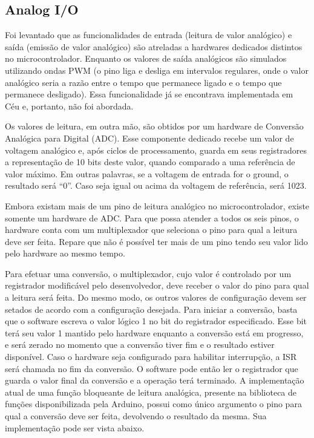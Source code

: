\documentclass{article}
\begin{document}
\subsection{Analog I/O}
\tab Foi levantado que as funcionalidades de entrada (leitura de valor analógico) e saída (emissão de valor analógico) são atreladas a hardwares dedicados distintos no microcontrolador. Enquanto os valores de saída analógicos são simulados utilizando ondas PWM (o pino liga e desliga em intervalos regulares, onde o valor analógico seria a razão entre o tempo que permanece ligado e o tempo que permanece desligado). Essa funcionalidade já se encontrava implementada em Céu e, portanto, não foi abordada.
\par Os valores de leitura, em outra mão, são obtidos por um hardware de Conversão Analógica para Digital (ADC). Esse componente dedicado recebe um valor de voltagem analógico e, após ciclos de processamento, guarda em seus registradores a representação de 10 bits deste valor, quando comparado a uma referência de valor máximo. Em outras palavras, se a voltagem de entrada for o ground, o resultado será “0”. Caso seja igual ou acima da voltagem de referência, será 1023. 
\par Embora existam mais de um pino de leitura analógico no microcontrolador, existe somente um hardware de ADC. Para que possa atender a todos os seis pinos, o hardware conta com um multiplexador que seleciona o pino para qual a leitura deve ser feita. Repare que não é possível ter mais de um pino tendo seu valor lido pelo hardware ao mesmo tempo. 
\par Para efetuar uma conversão, o multiplexador, cujo valor é controlado por um registrador modificável pelo desenvolvedor, deve receber o valor do pino para qual a leitura será feita. Do mesmo modo, os outros valores de configuração devem ser setados de acordo com a configuração desejada. Para iniciar a conversão, basta que o software escreva o valor lógico 1 no bit do registrador especificado. Esse bit terá seu valor 1 mantido pelo hardware enquanto a conversão está em progresso, e será zerado no momento que a conversão tiver fim e o resultado estiver disponível. Caso o hardware seja configurado para habilitar interrupção, a ISR será chamada no fim da conversão. O software pode então ler o registrador que guarda o valor final da conversão e a operação terá terminado.
\tab A implementação atual de uma função bloqueante de leitura analógica, presente na biblioteca de funções disponibilizada pela Arduino, possui como único argumento o pino para qual a conversão deve ser feita, devolvendo o resultado da mesma. Sua implementação pode ser vista abaixo.
\end{document}
